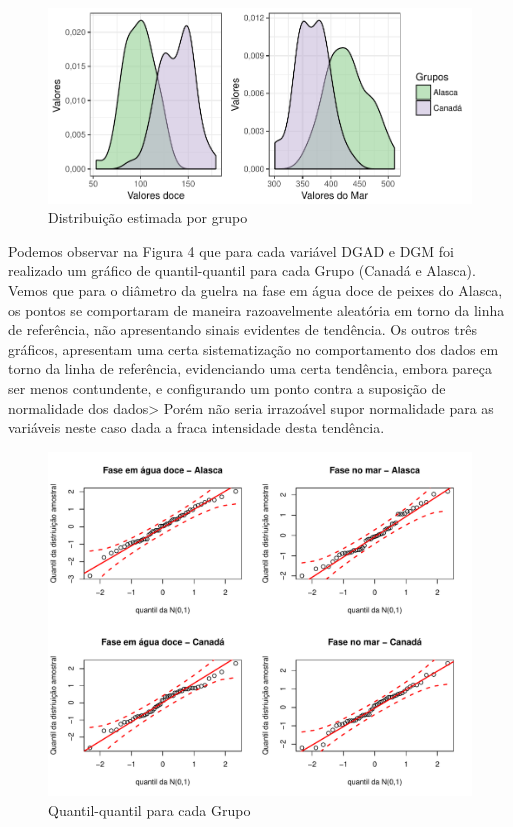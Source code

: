 \documentclass[10pt,portuguese,]{article}
\begin{document}
\begin{figure}[!h]

{\centering \includegraphics{RELATORIO_FINAL_FORMATADO_files/figure-latex/unnamed-chunk-12-1} 

}

\caption{Distribuição estimada por grupo}\label{fig:unnamed-chunk-12}
\end{figure}

Podemos observar na Figura 4 que para cada variável DGAD e DGM foi
realizado um gráfico de quantil-quantil para cada Grupo (Canadá e
Alasca). Vemos que para o diâmetro da guelra na fase em água doce de
peixes do Alasca, os pontos se comportaram de maneira razoavelmente
aleatória em torno da linha de referência, não apresentando sinais
evidentes de tendência. Os outros três gráficos, apresentam uma certa
sistematização no comportamento dos dados em torno da linha de
referência, evidenciando uma certa tendência, embora pareça ser menos
contundente, e configurando um ponto contra a suposição de normalidade
dos dados\textgreater{} Porém não seria irrazoável supor normalidade
para as variáveis neste caso dada a fraca intensidade desta tendência.

\vspace{0.5cm}

\begin{figure}[!h]

{\centering \includegraphics{RELATORIO_FINAL_FORMATADO_files/figure-latex/unnamed-chunk-13-1} 

}

\caption{Quantil-quantil para cada Grupo}\label{fig:unnamed-chunk-13}
\end{figure}
\end{document}
